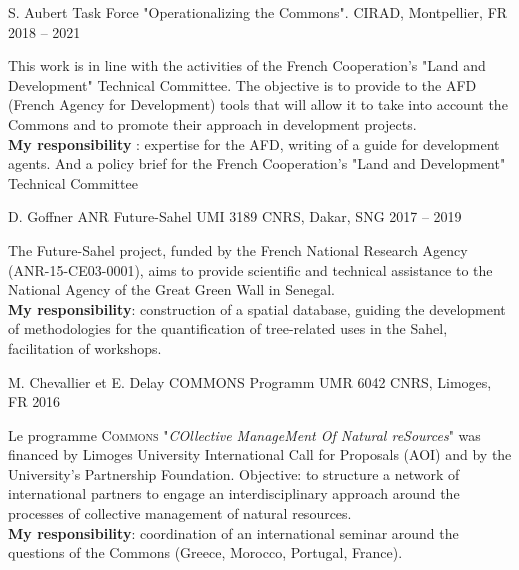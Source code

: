 \begin{cventries}
  \cventry
  {S. Aubert} %
  {Task Force "Operationalizing the Commons".} %
  {CIRAD, Montpellier, FR} %
  {2018 -- 2021} %
  {
    \begin{cvitems} %
      This work is in line with the activities of the French Cooperation's "Land and Development" Technical Committee. The objective is to provide to the AFD (French Agency for Development) tools that will allow it to take into account the Commons and to promote their approach in development projects.\\
      \textbf{My responsibility} : expertise for the AFD, writing of a guide for development agents. And a policy brief for the French Cooperation's "Land and Development" Technical Committee
    \end{cvitems}
  }

  \cventry
  {D. Goffner} %
  {ANR Future-Sahel} %
  {UMI 3189 CNRS, Dakar, SNG} %
  {2017 -- 2019} %
  {
    \begin{cvitems} %
      The Future-Sahel project, funded by the French National Research Agency (ANR-15-CE03-0001), aims to provide scientific and technical assistance to the National Agency of the Great Green Wall in Senegal.\\
      \textbf{My responsibility}: construction of a spatial database, guiding the development of methodologies for the quantification of tree-related uses in the Sahel, facilitation of workshops.
    \end{cvitems}
  }

  \cventry
  {M. Chevallier et E. Delay} %
  {COMMONS Programm} %
  {UMR 6042 CNRS, Limoges, FR} %
  {2016} %
  {
    \begin{cvitems} %
      Le programme \textsc{Commons} "\textit{COllective ManageMent Of Natural reSources}" was financed by Limoges University International Call for Proposals (AOI) and by the University's Partnership Foundation. Objective: to structure a network of international partners to engage an interdisciplinary approach around the processes of collective management of natural resources.\\
      \textbf{My responsibility}: coordination of an international seminar around the questions of the Commons (Greece, Morocco, Portugal, France).
    \end{cvitems}
  }


\end{cventries}
